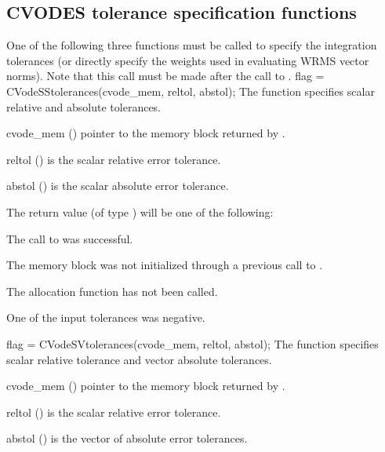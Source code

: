 \subsection{CVODES tolerance specification functions}\label{sss:cvtolerances}
One of the following three functions must be called to specify the integration
tolerances (or directly specify the weights used in evaluating WRMS vector norms).
Note that this call must be made after the call to .
{
  flag = CVodeSStolerances(cvode\_mem, reltol, abstol);
}
{
  The function  specifies scalar relative and absolute
  tolerances.
}
{
  \begin{args}
  \item[cvode\_mem] ()
    pointer to the {\cvodes} memory block returned by .
  \item[reltol] ()
    is the scalar relative error tolerance.
  \item[abstol] ()
    is the scalar absolute error tolerance.
  \end{args}
}
{
  The return value  (of type ) will be one of the following:
  \begin{args}
  \item[\Id{CV\_SUCCESS}]
    The call to  was successful.
  \item[\Id{CV\_MEM\_NULL}] 
    The {\cvodes} memory block was not initialized through a previous call to
    .
  \item[\Id{CV\_NO\_MALLOC}] 
    The allocation function  has not been called.
  \item[\Id{CV\_ILL\_INPUT}] 
    One of the input tolerances was negative.
  \end{args}
}
{}
{
  flag = CVodeSVtolerances(cvode\_mem, reltol, abstol);
}
{
  The function  specifies scalar relative tolerance and
  vector absolute tolerances.
}
{
  \begin{args}
  \item[cvode\_mem] ()
    pointer to the {\cvodes} memory block returned by .
  \item[reltol] ()
    is the scalar relative error tolerance.
  \item[abstol] ()
    is the vector of absolute error tolerances.
  \end{args}
}
